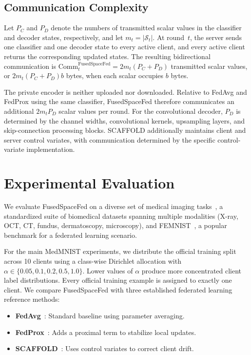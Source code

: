 \documentclass[twoside]{article}
\theoremstyle{thmstyleone}%
\theoremstyle{thmstyletwo}%
\theoremstyle{thmstylethree}%
\begin{document}
\subsection{Communication Complexity}

Let $P_C$ and $P_D$ denote the numbers of transmitted scalar values in the
classifier and decoder states, respectively, and let $m_t=|\mathcal{S}_t|$.
At round~$t$, the server sends one classifier and one decoder state to every
active client, and every active client returns the corresponding updated
states. The resulting bidirectional communication is
$\mathrm{Comm}_t^{\mathrm{FusedSpaceFed}}=2m_t(P_C+P_D)$
transmitted scalar values, or
$
2m_t(P_C+P_D)b
$
bytes, when each scalar occupies $b$ bytes.

The private encoder is neither uploaded nor downloaded. Relative to FedAvg and
FedProx using the same classifier, FusedSpaceFed therefore communicates an
additional $2m_tP_D$ scalar values per round. For the convolutional decoder,
$P_D$ is determined by the channel widths, convolutional kernels, upsampling
layers, and skip-connection processing blocks. SCAFFOLD additionally maintains
client and server control variates, with communication determined by the
specific control-variate implementation.


\section{Experimental Evaluation}\label{sec:experiments}

We evaluate FusedSpaceFed on a diverse set of medical imaging tasks~\cite{medmnistv2}, a standardized suite of biomedical datasets spanning multiple modalities (X-ray, OCT, CT, fundus, dermatoscopy, microscopy), and FEMNIST~\cite{caldas2018leaf}, a popular benchmark for a federated learning scenario.

For the main MedMNIST experiments, we distribute the official training split
across 10 clients using a class-wise Dirichlet allocation with
$\alpha\in\{0.05,0.1,0.2,0.5,1.0\}$. Lower values of $\alpha$ produce more
concentrated client label distributions. Every official training example is
assigned to exactly one client.
We compare FusedSpaceFed with three established federated learning reference methods:
\begin{itemize}
\item \textbf{FedAvg}~\cite{mcmahan2017communication}: Standard baseline using parameter averaging.
\item \textbf{FedProx}~\cite{li2018federated}: Adds a proximal term to stabilize local updates.
\item \textbf{SCAFFOLD}~\cite{karimireddy2020scaffold}: Uses control variates to correct client drift.
\end{itemize}
\end{document}
